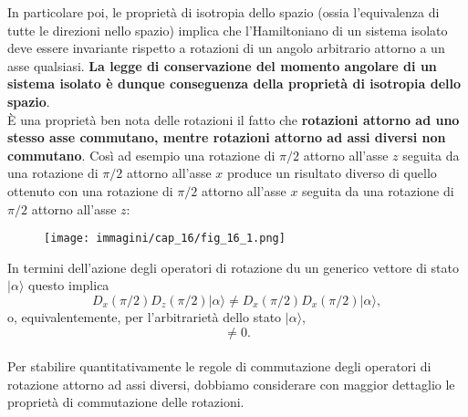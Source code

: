 In particolare poi, le proprietà di isotropia dello spazio (ossia l'equivalenza di tutte le direzioni nello spazio) implica che l'Hamiltoniano di un sistema isolato deve essere invariante rispetto a rotazioni di un angolo arbitrario attorno a un asse qualsiasi. \textbf{La legge di conservazione del momento angolare di un sistema isolato è dunque conseguenza della proprietà di isotropia dello spazio}.\\

È una proprietà ben nota delle rotazioni il fatto che \textbf{rotazioni attorno ad uno stesso asse commutano, mentre rotazioni attorno ad assi diversi non commutano}. Così ad esempio una rotazione di $\pi /2$ attorno all'asse $z$ seguita da una rotazione di $\pi /2$ attorno all'asse $x$ produce un risultato diverso di quello ottenuto con una rotazione di $\pi /2$ attorno all'asse $x$ seguita da una rotazione di $\pi /2$ attorno all'asse $z$:\\
\begin{figure}[!htbp]
\begin{center}
\texttt{[image: immagini/cap\_16/fig\_16\_1.png]}
\end{center}
\end{figure}


In termini dell'azione degli operatori di rotazione du un generico vettore di stato $\vert \alpha \rangle$ questo implica
	\begin{equation}
		D_x (\pi/2) D_z (\pi/2) \vert \alpha \rangle \neq D_x (\pi/2) D_x (\pi/2) \vert \alpha \rangle ,
	\end{equation}
o, equivalentemente, per l'arbitrarietà dello stato $\vert \alpha \rangle$,
\begin{equation}
[D_x (\pi/2); D_z (\pi/2)] \neq 0 .
\end{equation}\\

Per stabilire quantitativamente le regole di commutazione degli operatori di rotazione attorno ad assi diversi, dobbiamo considerare con maggior dettaglio le proprietà di commutazione delle rotazioni.\\

